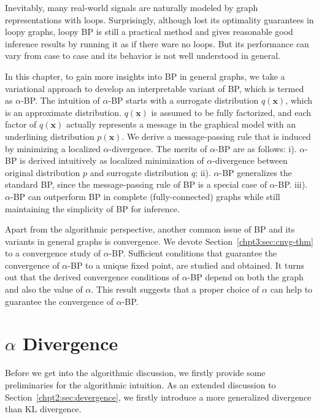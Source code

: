 Inevitably, many real-world signals are naturally modeled by graph representations with loops. Surprisingly, although lost its optimality guarantees in loopy graphs, loopy BP is still a practical method and gives reasonable good inference results by running it as if there ware no loops. But its performance can vary from case to case and its behavior is not well understood in general. 

In this chapter, to gain more insights into BP in general graphs, we take a variational approach to develop an interpretable variant of BP, which is termed as $\alpha$-BP.
The intuition of $\alpha$-BP starts with a surrogate distribution $q(\bm{x})$, which is an approximate distribution. $q(\bm{x})$ is assumed to be fully factorized, and each factor of $q(\bm{x})$ actually represents a message in the graphical model with an underlining distribution $p(\bm{x})$. We derive a message-passing rule that is induced by minimizing a localized $\alpha$-divergence. The merits of $\alpha$-BP are as follows: i). {$\alpha$-BP is derived intuitively as localized minimization of $\alpha$-divergence between original distribution $p$ and surrogate distribution $q$}; ii). {$\alpha$-BP generalizes the standard BP, since the message-passing rule of BP is a special case of $\alpha$-BP}. iii). {$\alpha$}-BP can outperform BP in complete (fully-connected) graphs while still maintaining the simplicity of BP for inference.

Apart from the algorithmic perspective, another common issue of BP and its variants in general graphs is convergence. We devote Section~\ref{chpt3:sec:cnvg-thm} to a convergence study of $\alpha$-BP. Sufficient conditions that guarantee the convergence of $\alpha$-BP to a unique fixed point, are studied and obtained. It turns out that the derived convergence conditions of $\alpha$-BP depend on both the graph and also the value of $\alpha$. This result suggests that a proper choice of $\alpha$ can help to guarantee the convergence of $\alpha$-BP.

\section{$\alpha$ Divergence}
\label{chpt3:sec:alpha-divergence}
Before we get into the algorithmic discussion, we firstly provide some preliminaries for the algorithmic intuition. As an extended discussion to Section~\ref{chpt2:sec:devergence}, we firstly introduce a more generalized divergence than $\mathrm{KL}$ divergence.

